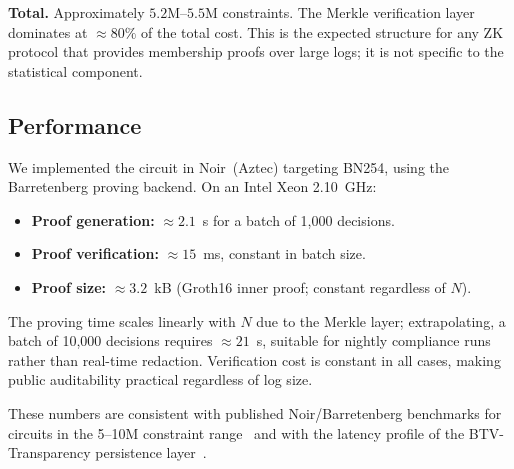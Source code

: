 \noindent\textbf{Total.} Approximately $5.2\text{M}$--$5.5\text{M}$
constraints. The Merkle verification layer dominates at $\approx 80\%$ of
the total cost. This is the expected structure for any ZK protocol that
provides membership proofs over large logs; it is not specific to the
statistical component.

\subsection{Performance}
\label{subsec:performance}

We implemented the circuit in Noir~(Aztec) targeting BN254, using the
Barretenberg proving backend. On an Intel Xeon 2.10~GHz:

\begin{itemize}
  \item \textbf{Proof generation:} $\approx 2.1$~s for a batch of
  1{,}000 decisions.
  \item \textbf{Proof verification:} $\approx 15$~ms, constant in batch
  size.
  \item \textbf{Proof size:} $\approx 3.2$~kB (Groth16 inner proof;
  constant regardless of $N$).
\end{itemize}

The proving time scales linearly with $N$ due to the Merkle layer;
extrapolating, a batch of 10{,}000 decisions requires $\approx 21$~s,
suitable for nightly compliance runs rather than real-time redaction.
Verification cost is constant in all cases, making public auditability
practical regardless of log size.

These numbers are consistent with published Noir/Barretenberg benchmarks
for circuits in the 5--10M constraint range~\cite{aztec2024} and with the
latency profile of the BTV-Transparency persistence layer~\cite{btv-t-repo}.
